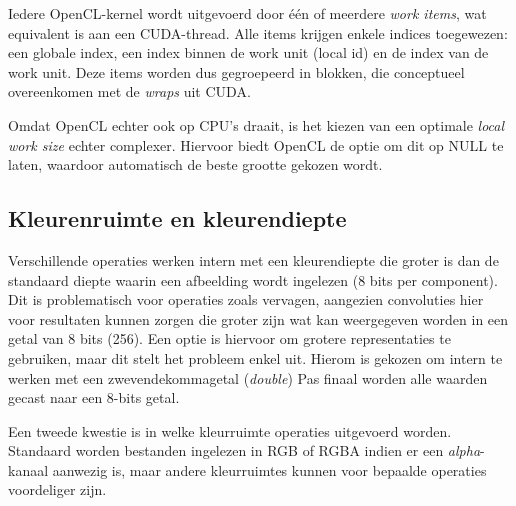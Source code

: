 \documentclass[twocolumn, a4paper]{article}
\begin{document}
Iedere OpenCL-kernel wordt uitgevoerd door één of meerdere \emph{work items}, wat equivalent is aan een CUDA-thread. Alle items krijgen enkele indices toegewezen: een globale index, een index binnen de work unit (local id) en de index van de work unit. Deze items worden dus gegroepeerd in blokken, die conceptueel overeenkomen met de \emph{wraps} uit CUDA. 

Omdat OpenCL echter ook op CPU's draait, is het kiezen van een optimale \emph{local work size} echter complexer. Hiervoor biedt OpenCL de optie om dit op NULL te laten, waardoor automatisch de beste grootte gekozen wordt.

\subsection{Kleurenruimte en kleurendiepte}
Verschillende operaties werken intern met een kleurendiepte die groter is dan de standaard diepte waarin een afbeelding wordt ingelezen (8 bits per component). Dit is problematisch voor operaties zoals vervagen, aangezien convoluties hier voor resultaten kunnen zorgen die groter zijn wat kan weergegeven worden in een getal van 8 bits (256). Een optie is hiervoor om grotere representaties te gebruiken, maar dit stelt het probleem enkel uit. Hierom is gekozen om intern te werken met een zwevendekommagetal (\emph{double}) Pas finaal worden alle waarden gecast naar een 8-bits getal.

Een tweede kwestie is in welke kleurruimte operaties uitgevoerd worden. Standaard worden bestanden ingelezen in RGB of RGBA indien er een \emph{alpha}-kanaal aanwezig is, maar andere kleurruimtes kunnen voor bepaalde operaties voordeliger zijn.
\end{document}
